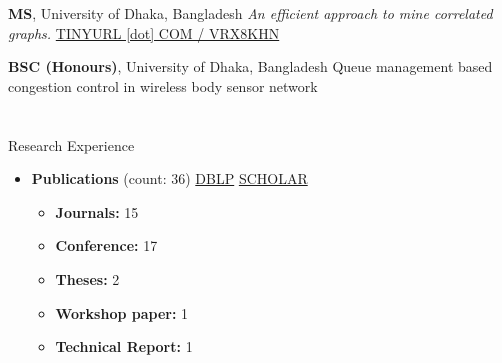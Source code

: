 \documentclass{my_cv}
\begin{document}
{\textbf{MS}, University of Dhaka, Bangladesh} %
{{\em An efficient approach to mine correlated graphs.} \href{https://tinyurl.com/vrx8khn}{TINYURL [dot] COM / VRX8KHN}}

{\textbf{BSC (Honours)}, University of Dhaka, Bangladesh} %
{Queue management based congestion control in wireless body sensor network}


\section{\faBinoculars}{Research Experience}
\begin{itemize}[noitemsep]
    \item \textbf{Publications} (count: 36) \hspace{10pt} \href{https://tinyurl.com/rrs885n}{\aidblp \hspace{5pt} DBLP} \hspace{10pt} \href{https://tinyurl.com/u92ce6l}{\aiGoogleScholarSquare \hspace{5pt} SCHOLAR}
        \begin{itemize}[noitemsep]
            \item \textbf{Journals:} 15
            \item \textbf{Conference:} 17
            \item \textbf{Theses:} 2
            \item \textbf{Workshop paper:} 1
            \item \textbf{Technical Report:} 1
        \end{itemize}
\end{itemize}
\end{document}
